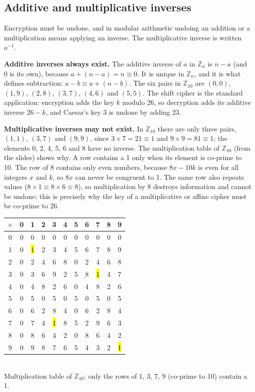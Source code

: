 \subsection{Additive and multiplicative inverses \hot}
Encryption must be undone, and in modular arithmetic undoing an addition or a multiplication means applying an inverse.  The multiplicative inverse is written $a^{-1}$.

\textbf{Additive inverses always exist.} The additive inverse of $a$ in $\mathbb{Z}_n$ is $n - a$ (and 0 is its own), because $a + (n - a) = n \equiv 0$. It is unique in $\mathbb{Z}_n$, and it is what defines subtraction: $a - b \equiv a + (n - b)$. The six pairs in $\mathbb{Z}_{10}$ are $(0, 0)$, $(1, 9)$, $(2, 8)$, $(3, 7)$, $(4, 6)$ and $(5, 5)$. The shift cipher is the standard application: encryption adds the key $k$ modulo 26, so decryption adds its additive inverse $26 - k$, and Caesar's key 3 is undone by adding 23.

\textbf{Multiplicative inverses may not exist.} In $\mathbb{Z}_{10}$ there are only three pairs, $(1, 1)$, $(3, 7)$ and $(9, 9)$, since $3 \times 7 = 21 \equiv 1$ and $9 \times 9 = 81 \equiv 1$; the elements 0, 2, 4, 5, 6 and 8 have no inverse. The multiplication table of $\mathbb{Z}_{10}$ (from the slides) shows why. A row contains a 1 only when its element is co-prime to 10. The row of 8 contains only even numbers, because $8x - 10k$ is even for all integers $x$ and $k$, so $8x$ can never be congruent to 1. The same row also repeats values ($8 \times 1 \equiv 8 \times 6 \equiv 8$), so multiplication by 8 destroys information and cannot be undone; this is precisely why the key of a multiplicative or affine cipher must be co-prime to 26.
\begin{center}\small\setlength{\tabcolsep}{4.5pt}
\begin{tabular}{@{}c|cccccccccc@{}}
$\times$ & 0&1&2&3&4&5&6&7&8&9\\
\midrule
0 & 0&0&0&0&0&0&0&0&0&0\\
1 & 0&\hl{1}&2&3&4&5&6&7&8&9\\
2 & 0&2&4&6&8&0&2&4&6&8\\
3 & 0&3&6&9&2&5&8&\hl{1}&4&7\\
4 & 0&4&8&2&6&0&4&8&2&6\\
5 & 0&5&0&5&0&5&0&5&0&5\\
6 & 0&6&2&8&4&0&6&2&8&4\\
7 & 0&7&4&\hl{1}&8&5&2&9&6&3\\
8 & 0&8&6&4&2&0&8&6&4&2\\
9 & 0&9&8&7&6&5&4&3&2&\hl{1}\\
\end{tabular}\\[2pt]
{\footnotesize Multiplication table of $\mathbb{Z}_{10}$: only the rows of 1, 3, 7, 9 (co-prime to 10) contain a 1.}
\end{center}

